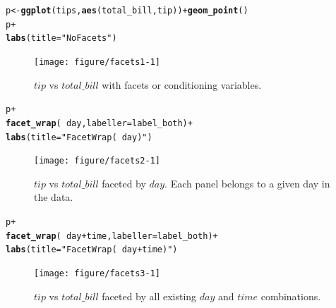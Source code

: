 \documentclass[stat,dissertation]{puthesis}\usepackage[]{graphicx}\usepackage{xcolor}
\makeatletter
\newcommand{\hlstr}[1]{\textcolor[rgb]{0.192,0.494,0.8}{#1}}%
\newcommand{\hlopt}[1]{\textcolor[rgb]{0,0,0}{#1}}%
\newcommand{\hlstd}[1]{\textcolor[rgb]{0.345,0.345,0.345}{#1}}%
\newcommand{\hlkwb}[1]{\textcolor[rgb]{0.69,0.353,0.396}{#1}}%
\newcommand{\hlkwc}[1]{\textcolor[rgb]{0.333,0.667,0.333}{#1}}%
\newcommand{\hlkwd}[1]{\textcolor[rgb]{0.737,0.353,0.396}{\textbf{#1}}}%
\newenvironment{kframe}{%
 \def\at@end@of@kframe{}%
 \ifinner\ifhmode%
  \def\at@end@of@kframe{\end{minipage}}%
  \begin{minipage}{\columnwidth}%
 \fi\fi%
 \def\FrameCommand##1{\hskip\@totalleftmargin \hskip-\fboxsep
 \colorbox{shadecolor}{##1}\hskip-\fboxsep
     \hskip-\linewidth \hskip-\@totalleftmargin \hskip\columnwidth}%
 \MakeFramed {\advance\hsize-\width
   \@totalleftmargin\z@ \linewidth\hsize
   \@setminipage}}%
 {\par\unskip\endMakeFramed%
 \at@end@of@kframe}
\newenvironment{knitrout}{}{} %
\renewenvironment{knitrout}{\setstretch{1}}{}
\makeatother
\begin{document}
\begin{knitrout}\small
{}\color{fgcolor}\begin{kframe}
\begin{alltt}
\hlstd{p} \hlkwb{<-} \hlkwd{ggplot}\hlstd{(tips,} \hlkwd{aes}\hlstd{(total_bill, tip))} \hlopt{+} \hlkwd{geom_point}\hlstd{()}
\hlstd{p} \hlopt{+}
  \hlkwd{labs}\hlstd{(}\hlkwc{title} \hlstd{=} \hlstr{"No Facets"}\hlstd{)}
\end{alltt}
\end{kframe}\begin{figure}[H]

{\centering \texttt{[image: figure/facets1-1]} 

}

\caption{$tip$ vs $total\_bill$ with facets or conditioning variables.}\label{fig:facets1}
\end{figure}


\end{knitrout}
\newpage
\begin{knitrout}\small
{}\color{fgcolor}\begin{kframe}
\begin{alltt}
\hlstd{p} \hlopt{+}
  \hlkwd{facet_wrap}\hlstd{(}\hlopt{~} \hlstd{day,} \hlkwc{labeller} \hlstd{= label_both)} \hlopt{+}
  \hlkwd{labs}\hlstd{(}\hlkwc{title} \hlstd{=} \hlstr{"Facet Wrap (~ day)"}\hlstd{)}
\end{alltt}
\end{kframe}\begin{figure}[H]

{\centering \texttt{[image: figure/facets2-1]} 

}

\caption{$tip$ vs $total\_bill$ faceted by $day$. Each panel belongs to a given day in the data.}\label{fig:facets2}
\end{figure}


\end{knitrout}
\newpage
\begin{knitrout}\small
{}\color{fgcolor}\begin{kframe}
\begin{alltt}
\hlstd{p} \hlopt{+}
  \hlkwd{facet_wrap}\hlstd{(}\hlopt{~} \hlstd{day} \hlopt{+} \hlstd{time,} \hlkwc{labeller} \hlstd{= label_both)} \hlopt{+}
  \hlkwd{labs}\hlstd{(}\hlkwc{title} \hlstd{=} \hlstr{"Facet Wrap (~ day + time)"}\hlstd{)}
\end{alltt}
\end{kframe}\begin{figure}[H]

{\centering \texttt{[image: figure/facets3-1]} 

}

\caption{$tip$ vs $total\_bill$ faceted by all existing $day$ and $time$ combinations.}\label{fig:facets3}
\end{figure}


\end{knitrout}
\end{document}
